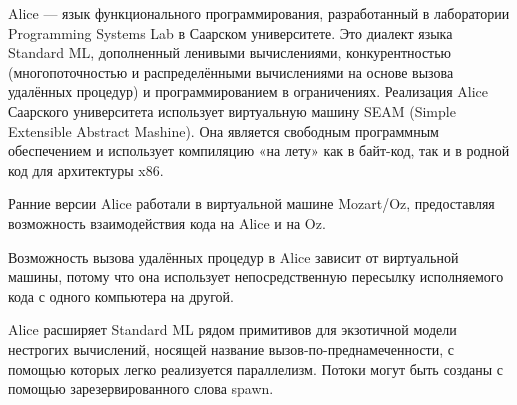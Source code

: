 \documentclass[14pt]{article}
\begin{document}
Alice — язык функционального программирования, разработанный в лаборатории Programming Systems Lab в Саарском университете. Это диалект языка Standard ML, дополненный ленивыми вычислениями, конкурентностью (многопоточностью и распределёнными вычислениями на основе вызова удалённых процедур) и программированием в ограничениях.
Реализация Alice Саарского университета использует виртуальную машину SEAM (Simple Extensible Abstract Mashine). Она является свободным программным обеспечением и использует компиляцию «на лету» как в байт-код, так и в родной код для архитектуры x86.

Ранние версии Alice работали в виртуальной машине Mozart/Oz, предоставляя возможность взаимодействия кода на Alice и на Oz.

Возможность вызова удалённых процедур в Alice зависит от виртуальной машины, потому что она использует непосредственную пересылку исполняемого кода с одного компьютера на другой.

Alice расширяет Standard ML рядом примитивов для экзотичной модели нестрогих вычислений, носящей название вызов-по-преднамеченности, с помощью которых легко реализуется параллелизм. Потоки могут быть созданы с помощью зарезервированного слова spawn.
\end{document}

